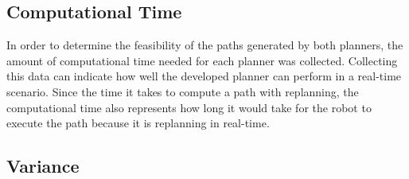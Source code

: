 \subsection{Computational Time}

In order to determine the feasibility of the paths generated by both planners,
the amount of computational time needed for each planner was collected.
Collecting this data can indicate how well the developed planner can perform in
a real-time scenario. Since the time it takes to compute a path with
replanning, the computational time also represents how long it would take for
the robot to execute the path because it is replanning in real-time.

\subsection{Variance}


